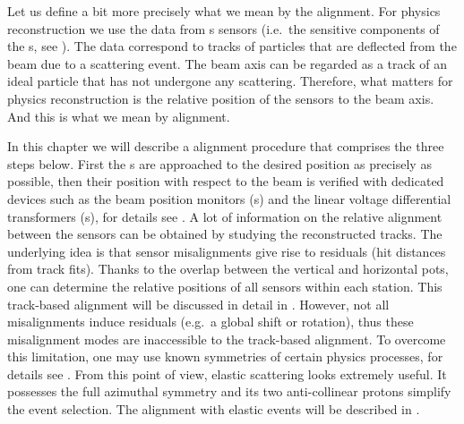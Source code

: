 Let us define a bit more precisely what we mean by the  alignment. For physics reconstruction we use the data from s sensors (i.e.~the sensitive components of the s, see ). The data correspond to tracks of particles that are deflected from the beam due to a scattering event. The beam axis can be regarded as a track of an ideal particle that has not undergone any scattering. Therefore, what matters for physics reconstruction is the relative position of the  sensors to the beam axis. And this is what we mean by  alignment.


In this chapter we will describe a  alignment procedure that comprises the three steps below.
\bitm
\itm First the s are approached to the desired position as precisely as possible, then their position with respect to the beam is verified  with dedicated devices such as the beam position monitors (s) and the linear voltage differential transformers (s), for details see .
\itm A lot of information on the relative alignment between the  sensors can be obtained by studying the reconstructed tracks. The underlying idea is that sensor misalignments give rise to residuals (hit distances from track fits). Thanks to the overlap between the vertical and horizontal pots, one can determine the relative positions of all  sensors within each station. This track-based alignment will be discussed in detail in .
\itm However, not all misalignments induce residuals (e.g.~a global shift or rotation), thus these misalignment modes are inaccessible to the track-based alignment. To overcome this limitation, one may use known symmetries of certain physics processes, for details see . From this point of view, elastic scattering looks extremely useful. It possesses the full azimuthal symmetry and its two anti-collinear protons simplify the event selection. The alignment with elastic events will be described in .
\eitm

